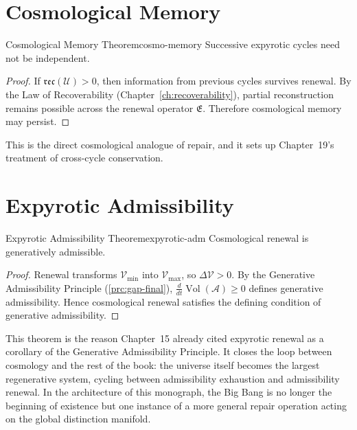 \documentclass[12pt,twoside,openright]{book}
\newcommand{\reco}{\mathfrak{rec}}
\newcommand{\Vol}{\operatorname{Vol}}
\begin{document}
\section{Cosmological Memory}
\label{sec:ch18-memory}

\begin{theorem}{Cosmological Memory Theorem}{cosmo-memory}
  Successive expyrotic cycles need not be independent.
\end{theorem}

\begin{proof}
  If $\reco(\mathcal{U}) > 0$, then information from
  previous cycles survives renewal. By the Law of
  Recoverability (Chapter~\ref{ch:recoverability}), partial
  reconstruction remains possible across the renewal
  operator $\mathfrak{E}$. Therefore cosmological memory may
  persist.
\end{proof}

This is the direct cosmological analogue of repair, and it
sets up Chapter~19's treatment of cross-cycle conservation.

\section{Expyrotic Admissibility}
\label{sec:ch18-admissibility}

\begin{theorem}{Expyrotic Admissibility Theorem}{expyrotic-adm}
  Cosmological renewal is generatively admissible.
  \parencite{steinhardt2002,penrose2010}
\end{theorem}

\begin{proof}
  Renewal transforms $\mathcal{V}_{\min}$ into
  $\mathcal{V}_{\max}$, so $\Delta\mathcal{V} > 0$. By the
  Generative Admissibility Principle
  (\cref{prc:gap-final}), $\frac{d}{dt}\Vol(\mathcal{A}) \ge 0$
  defines generative admissibility. Hence cosmological
  renewal satisfies the defining condition of generative
  admissibility.
\end{proof}

This theorem is the reason Chapter~15 already cited
expyrotic renewal as a corollary of the Generative
Admissibility Principle. It closes the loop between
cosmology and the rest of the book: the universe itself
becomes the largest regenerative system, cycling between
admissibility exhaustion and admissibility renewal. In the
architecture of this monograph, the Big Bang is no longer
the beginning of existence but one instance of a more
general repair operation acting on the global distinction
manifold.
\end{document}
